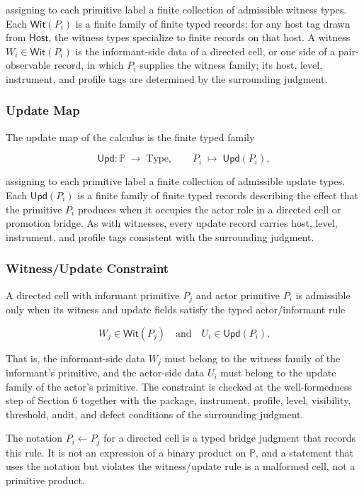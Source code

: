 \documentclass[11pt]{article}
\theoremstyle{definition}
\begin{document}
assigning to each primitive label a finite collection of admissible witness types. Each \(\mathsf{Wit}(P_i)\) is a finite family of finite typed records: for any host tag drawn from \(\mathsf{Host}\), the witness types specialize to finite records on that host. A witness \(W_i\in\mathsf{Wit}(P_i)\) is the informant-side data of a directed cell, or one side of a pair-observable record, in which \(P_i\) supplies the witness family; its host, level, instrument, and profile tags are determined by the surrounding judgment.

\subsubsection{Update Map}

The update map of the calculus is the finite typed family

\[
\mathsf{Upd}\colon\mathbb P\;\to\;\mathrm{Type},\qquad P_i\;\mapsto\;\mathsf{Upd}(P_i),
\]

assigning to each primitive label a finite collection of admissible update types. Each \(\mathsf{Upd}(P_i)\) is a finite family of finite typed records describing the effect that the primitive \(P_i\) produces when it occupies the actor role in a directed cell or promotion bridge. As with witnesses, every update record carries host, level, instrument, and profile tags consistent with the surrounding judgment.

\subsubsection{Witness/Update Constraint}

A directed cell with informant primitive \(P_j\) and actor primitive \(P_i\) is admissible only when its witness and update fields satisfy the typed actor/informant rule

\[
W_j\in\mathsf{Wit}(P_j)\quad\text{and}\quad U_i\in\mathsf{Upd}(P_i).
\]

That is, the informant-side data \(W_j\) must belong to the witness family of the informant's primitive, and the actor-side data \(U_i\) must belong to the update family of the actor's primitive. The constraint is checked at the well-formedness step of Section 6 together with the package, instrument, profile, level, visibility, threshold, audit, and defect conditions of the surrounding judgment.

The notation \(P_i\leftarrow P_j\) for a directed cell is a typed bridge judgment that records this rule. It is not an expression of a binary product on \(\mathbb P\), and a statement that uses the notation but violates the witness/update rule is a malformed cell, not a primitive product.
\end{document}
